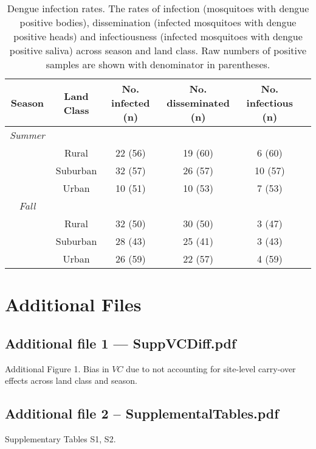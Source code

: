 \documentclass[doublespacing, linenumbers]{bmcart}
\begin{document}
\begin{backmatter}
\begin{table}[h!]
\caption{Dengue infection rates. The rates of infection (mosquitoes with dengue positive bodies), dissemination (infected mosquitoes with dengue positive heads) and infectiousness (infected mosquitoes with dengue positive saliva) across season and land class. Raw numbers of positive samples are shown with denominator in parentheses.}
  \begin{tabular}{cccccc}
  \hline
  \textbf{Season} & \textbf{Land Class} & \textbf{No. infected (n)}  & \textbf{No. disseminated (n)} & \textbf{No. infectious (n)}\\ \hline
  \textit{Summer} 	&   &   &   &   \\
   					& Rural 	& 22 (56) & 19 (60) & 6 (60) \\
  					& Suburban 	& 32 (57) & 26 (57) & 10 (57) \\
  					& Urban 	& 10 (51) & 10 (53) & 7 (53) \\

  \textit{Fall} 	&   &   &   &   \\
   					& Rural 	& 32 (50) & 30 (50) & 3 (47) \\
  					& Suburban 	& 28 (43) & 25 (41) & 3 (43) \\
  					& Urban 	& 26 (59) & 22 (57) & 4 (59) \\
  \hline
  \end{tabular}
    \label{table:infectionRates}
\end{table}


\section*{Additional Files}
  \subsection*{Additional file 1 --- SuppVCDiff.pdf}
    Additional Figure 1. Bias in $VC$ due to not accounting for site-level carry-over effects across land class and season.
    \subsection*{Additional file 2 -- SupplementalTables.pdf}
    Supplementary Tables S1, S2.

\end{backmatter}
\end{document}
